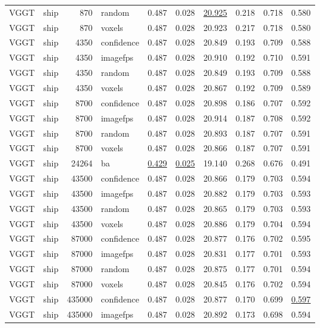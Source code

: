 \begin{table}[H]
\begin{tabular}{llrlrrrrrr}
VGGT & ship & 870 & random & 0.487 & 0.028 & \underline{20.925} & 0.218 & 0.718 & 0.580 \\
VGGT & ship & 870 & voxels & 0.487 & 0.028 & 20.923 & 0.217 & 0.718 & 0.580 \\
VGGT & ship & 4350 & confidence & 0.487 & 0.028 & 20.849 & 0.193 & 0.709 & 0.588 \\
VGGT & ship & 4350 & imagefps & 0.487 & 0.028 & 20.910 & 0.192 & 0.710 & 0.591 \\
VGGT & ship & 4350 & random & 0.487 & 0.028 & 20.849 & 0.193 & 0.709 & 0.588 \\
VGGT & ship & 4350 & voxels & 0.487 & 0.028 & 20.867 & 0.192 & 0.709 & 0.589 \\
VGGT & ship & 8700 & confidence & 0.487 & 0.028 & 20.898 & 0.186 & 0.707 & 0.592 \\
VGGT & ship & 8700 & imagefps & 0.487 & 0.028 & 20.914 & 0.187 & 0.708 & 0.592 \\
VGGT & ship & 8700 & random & 0.487 & 0.028 & 20.893 & 0.187 & 0.707 & 0.591 \\
VGGT & ship & 8700 & voxels & 0.487 & 0.028 & 20.866 & 0.187 & 0.707 & 0.591 \\
VGGT & ship & 24264 & ba & \underline{0.429} & \underline{0.025} & 19.140 & 0.268 & 0.676 & 0.491 \\
VGGT & ship & 43500 & confidence & 0.487 & 0.028 & 20.866 & 0.179 & 0.703 & 0.594 \\
VGGT & ship & 43500 & imagefps & 0.487 & 0.028 & 20.882 & 0.179 & 0.703 & 0.593 \\
VGGT & ship & 43500 & random & 0.487 & 0.028 & 20.865 & 0.179 & 0.703 & 0.593 \\
VGGT & ship & 43500 & voxels & 0.487 & 0.028 & 20.886 & 0.179 & 0.704 & 0.594 \\
VGGT & ship & 87000 & confidence & 0.487 & 0.028 & 20.877 & 0.176 & 0.702 & 0.595 \\
VGGT & ship & 87000 & imagefps & 0.487 & 0.028 & 20.831 & 0.177 & 0.701 & 0.593 \\
VGGT & ship & 87000 & random & 0.487 & 0.028 & 20.875 & 0.177 & 0.701 & 0.594 \\
VGGT & ship & 87000 & voxels & 0.487 & 0.028 & 20.845 & 0.176 & 0.702 & 0.594 \\
VGGT & ship & 435000 & confidence & 0.487 & 0.028 & 20.877 & 0.170 & 0.699 & \underline{0.597} \\
VGGT & ship & 435000 & imagefps & 0.487 & 0.028 & 20.892 & 0.173 & 0.698 & 0.594 \\

\end{tabular}
\end{table}
